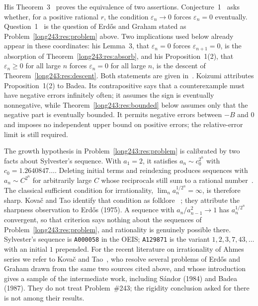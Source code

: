 \documentclass[11pt]{article}
\begin{document}
His Theorem~3~\cite[pp.~12--13]{koizumi2025} proves the equivalence of
two assertions. Conjecture~1~\cite[p.~4]{koizumi2025} asks whether, for
a positive rational $r$, the condition $\varepsilon_n\to0$ forces
$\varepsilon_n=0$ eventually. Question~1~\cite[p.~3]{koizumi2025} is the
question of Erd\H{o}s and Graham stated as
Problem~\ref{long243:res:problem} above.
Two implications used below already appear in these coordinates: his Lemma~3, that $\varepsilon_n=0$ forces $\varepsilon_{n+1}=0$,
is the absorption of Theorem~\ref{long243:res:absorb}, and his Proposition~1(2), that
$\varepsilon_n\ge0$ for all large $n$ forces $\varepsilon_n=0$ for all large
$n$, is the descent of Theorem~\ref{long243:res:descent}.  Both statements are given in~\cite[Lemma~3, p.~10; Prop.~1(2), p.~14]{koizumi2025}.
Koizumi attributes Proposition~1(2) to Badea.  Its contrapositive says that a
counterexample must have negative errors infinitely often; it assumes the sign
is eventually nonnegative, while Theorem~\ref{long243:res:bounded} below assumes only
that the negative part is eventually bounded. It permits negative errors
between $-B$ and $0$ and imposes no independent upper bound on positive
errors; the relative-error limit is still required.

The growth hypothesis in Problem~\ref{long243:res:problem} is calibrated by two facts
about Sylvester's sequence. With $a_1=2$, it satisfies
$a_n\sim c_0^{2^{n}}$ with $c_0=1.2640847\ldots$. Deleting initial terms
and reindexing produces sequences with $a_n\sim C^{2^{n}}$ for arbitrarily
large $C$ whose reciprocals still sum
to a rational number~\cite[arXiv v4, p.~2]{kovactao2024}.  The classical sufficient
condition for irrationality, $\lim_n a_n^{1/2^{n}}=\infty$, is therefore
sharp.  Kova\v{c} and Tao identify that condition as folklore
~\cite[arXiv v4, p.~2]{kovactao2024}; they attribute the sharpness observation to
Erd\H{o}s (1975).  A sequence with
$a_n/a_{n-1}^{2}\to1$ has $a_n^{1/2^{n}}$
convergent, so that criterion says nothing about the sequences of
Problem~\ref{long243:res:problem}, and rationality is genuinely possible there.
Sylvester's
sequence is \texttt{A000058} in the OEIS; \texttt{A129871} is the variant
$1,2,3,7,43,\ldots$ with an initial $1$ prepended. For
the recent literature on irrationality of Ahmes series we refer to Kova\v{c}
and Tao~\cite{kovactao2024}, who resolve several problems of Erd\H{o}s and
Graham drawn from the same two sources cited above, and whose introduction
gives a sample of the intermediate work, including S\'andor (1984) and Badea
(1987).  They do not treat Problem~\#243; the rigidity conclusion asked for
there is not among their results.
\end{document}
